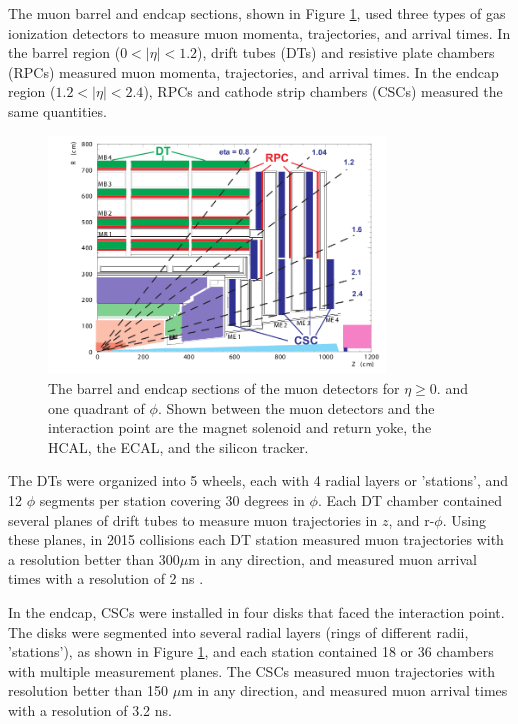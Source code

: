 The muon barrel and endcap sections, shown in Figure \ref{fig:muonBarrelAndEndcapDetectors}, used three types of 
gas ionization detectors to measure muon momenta, trajectories, and arrival times.  In the barrel region ($0 < |\eta| < 1.2$), 
drift tubes (DTs) and resistive plate chambers (RPCs) measured muon momenta, trajectories, and arrival times.  In 
the endcap region ($1.2 < |\eta| < 2.4$), RPCs and cathode strip chambers (CSCs) measured the same quantities.

\begin{figure}[ht]
	\centering
	\includegraphics[width=0.8\textwidth]{figures/muonDetectorLayout.png}
	\caption{The barrel and endcap sections of the muon detectors for $\eta \geq 0.$ and one quadrant of $\phi$.  Shown 
		between the muon detectors and the interaction point are the magnet solenoid and return yoke, the HCAL, the ECAL, 
		and the silicon tracker.}
	\label{fig:muonBarrelAndEndcapDetectors}
\end{figure}

The DTs were organized into 5 wheels, each with 4 radial layers or 'stations', and 12 $\phi$ segments per 
station covering 30 degrees in $\phi$.  Each DT chamber contained several planes of drift tubes to measure 
muon trajectories in $z$, and r-$\phi$.  Using these planes, in 2015 collisions each DT station measured muon trajectories 
with a resolution better than 300$\mu$m in any direction, and measured muon arrival times with a resolution of 2 ns \cite{cmsMuonRecoRunTwo}.  

In the endcap, CSCs were installed in four disks that faced the interaction point.  
The disks were segmented into several radial layers (rings of different radii, 'stations'), as shown in Figure \ref{fig:muonBarrelAndEndcapDetectors}, 
and each station contained 18 or 36 chambers with multiple measurement planes.  The CSCs measured muon trajectories with 
resolution better than 150 $\mu$m in any direction, and measured muon arrival times with a resolution of 3.2 ns.  

